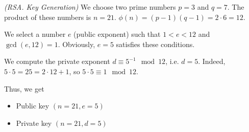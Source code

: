 \begin{example}
\emph{(RSA. Key Generation)}
We choose two prime numbers $p = 3$ and $q = 7$. The product of these numbers is $n = 21$. 
\(
\phi\left(n\right)=\left(p - 1 \right)\left(q - 1 \right) = 2 \cdot 6 = 12
\). 

We select a number $e$ (public exponent) such that $1 < e < 12$ and  
$\gcd\left( e, 12 \right) = 1$. Obviously, $e = 5$ satisfies these conditions. 

We compute the private exponent $d \equiv 5^{-1} \mod{12}$, i.e. $d = 5$. 
Indeed, $5 \cdot 5 = 25 = 2 \cdot 12 + 1$, so $5 \cdot 5 \equiv 1 \mod{12}$.

Thus, we get
\begin{itemize}
\item Public key $\left(n=21, e=5\right)$
\item Private key $\left(n=21, d=5\right)$
\end{itemize}
\label{exAddRSAKeyGen}
\end{example}